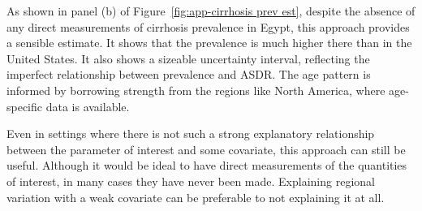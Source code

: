 As shown in panel (b) of Figure~\ref{fig:app-cirrhosis prev est},
despite the absence of any direct measurements of cirrhosis prevalence
in Egypt, this approach provides a sensible estimate.  It shows that
the prevalence is much higher there than in the United States.  It
also shows a sizeable uncertainty interval, reflecting the imperfect
relationship between prevalence and ASDR.  The age pattern is informed
by borrowing strength from the regions like North America, where
age-specific data is available.

Even in settings where there is not such a strong explanatory
relationship between the parameter of interest and some covariate,
this approach can still be useful.  Although it would be ideal to have
direct measurements of the quantities of interest, in many cases they
have never been made.  Explaining regional variation with a weak
covariate can be preferable to not explaining it at all.

